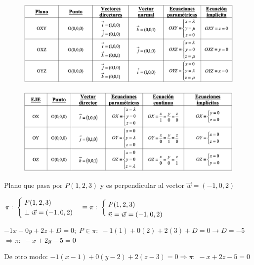 \begin{proofw}
 \vspace{2mm}\rightline{\noindent \textit{\small{\textcolor{gris}{($\lambda$ lambda; $\mu$ mu; $\theta$ theta; $\varphi$ phi; $\nu$ nu; $\xi$ xi)}}}}
 
 \justify

 \begin{figure}[H]
		\centering
		\includegraphics[width=1\textwidth]{imagenes/imagenes10/T10IM06.png}
 \end{figure}

 \begin{figure}[H]
		\centering
		\includegraphics[width=1\textwidth]{imagenes/imagenes10/T10IM07.png}
 \end{figure}
	
\end{proofw}

\begin{ejre}
Plano que pasa por $P(1,2,3)$ y es perpendicular al vector $\vec w=(-1,0,2)$	
\end{ejre}
\begin{proofw}\renewcommand{\qedsymbol}{$\diamond$}
$\pi:\; \begin{cases} \; P(1,2,3)\\ \; \bot\; \vec w=(-1,0,2) \end{cases} \equiv \pi:\; \begin{cases} \;P(1,2,3) \\ \; \vec n\vspace{-2mm} =\vec w=(-1,0,2) \end{cases}$	

\noindent \small{$-1x+0y+2z+D=0;\; P\in \pi:\; -1(1)+0(2)+2(3)+D=0 \to D=-5 $} \normalsize{$\Rightarrow \pi:\; -x+2y-5=0$}

\noindent \textcolor{gris}{De otro modo: $-1(x-1)+0(y-2)+2(z-3)=0 \Rightarrow \pi:\;-x+2z-5=0$}
\end{proofw}



